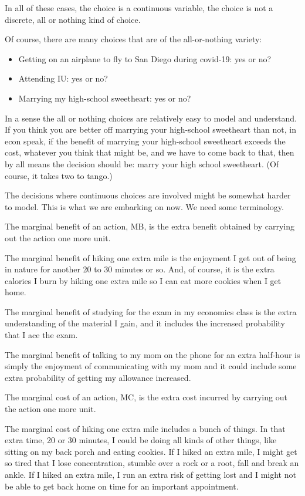 \documentclass[
]{book}
\providecommand{\tightlist}{%
  \setlength{\itemsep}{0pt}\setlength{\parskip}{0pt}}
\begin{document}
In all of these cases, the choice is a continuous variable, the choice is not a discrete, all or nothing kind of choice.

Of course, there are many choices that are of the all-or-nothing variety:

\begin{itemize}
\tightlist
\item
  Getting on an airplane to fly to San Diego during covid-19: yes or no?
\item
  Attending IU: yes or no?
\item
  Marrying my high-school sweetheart: yes or no?
\end{itemize}

In a sense the all or nothing choices are relatively easy to model and understand. If you think you are better off marrying your high-school sweetheart than not, in econ speak, if the benefit of marrying your high-school sweetheart exceeds the cost, whatever you think that might be, and we have to come back to that, then by all means the decision should be: marry your high school sweetheart. (Of course, it takes two to tango.)

The decisions where continuous choices are involved might be somewhat harder to model. This is what we are embarking on now. We need some terminology.

The marginal benefit of an action, MB, is the extra benefit obtained by carrying out the action one more unit.

The marginal benefit of hiking one extra mile is the enjoyment I get out of being in nature for another 20 to 30 minutes or so. And, of course, it is the extra calories I burn by hiking one extra mile so I can eat more cookies when I get home.

The marginal benefit of studying for the exam in my economics class is the extra understanding of the material I gain, and it includes the increased probability that I ace the exam.

The marginal benefit of talking to my mom on the phone for an extra half-hour is simply the enjoyment of communicating with my mom and it could include some extra probability of getting my allowance increased.

The marginal cost of an action, MC, is the extra cost incurred by carrying out the action one more unit.

The marginal cost of hiking one extra mile includes a bunch of things. In that extra time, 20 or 30 minutes, I could be doing all kinds of other things, like sitting on my back porch and eating cookies. If I hiked an extra mile, I might get so tired that I lose concentration, stumble over a rock or a root, fall and break an ankle. If I hiked an extra mile, I run an extra risk of getting lost and I might not be able to get back home on time for an important appointment.
\end{document}
